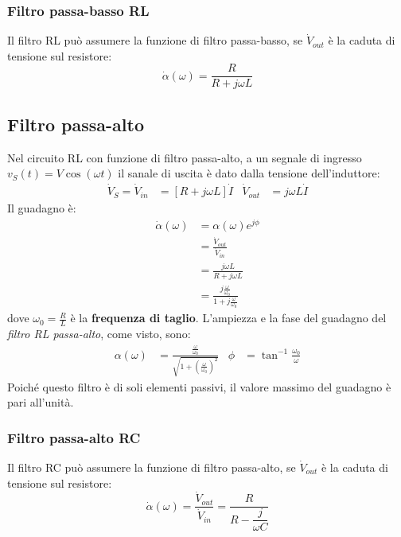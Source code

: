 \documentclass{article}
\begin{document}
\subsubsection{Filtro passa-basso RL}
Il filtro RL può assumere la funzione di filtro
passa-basso, se $\dot V_{out}$ è la caduta di tensione sul resistore:
\[\dot \alpha(\omega)=\frac{R}{R+j \omega L}\]



\subsection{Filtro passa-alto}
Nel circuito RL con funzione di filtro passa-alto, a un segnale di ingresso $v_S(t)=V \cos(\omega t)$ il sanale di uscita è dato dalla tensione dell'induttore:
\begin{align*}
    \dot V_S = \dot V_{in} &= \left[R + j \omega L\right]\dot I & \dot V_{out} &= j \omega L \dot I
\end{align*}
Il guadagno è:
\begin{align*}
    \dot \alpha(\omega) &= \alpha(\omega) e^{j \phi}
    \\
    &=\frac{\dot V_{out}}{\dot V_{in}}
    \\
    &= \frac{j \omega L}{R+j \omega L}
    \\
    &= \frac{j \frac{\omega}{\omega_0}}{1+j \frac{\omega}{\omega_0}}
\end{align*}
dove $\omega_0 = \frac{R}{L}$ è la \textbf{frequenza di taglio}. L'ampiezza e la fase del guadagno del \textit{filtro RL passa-alto}, come visto, sono:
\begin{align*}
    \alpha(\omega) &= \frac{\frac{\omega}{\omega_0}}{\sqrt{1+\left(\frac{\omega}{\omega_0}\right)^2}} & \phi &= \tan^{-1} \frac{\omega_0}{\omega}
\end{align*}
Poiché questo filtro è di soli elementi passivi, il
valore massimo del guadagno è pari all'unità.


\subsubsection{Filtro passa-alto RC}
Il filtro RC può assumere la funzione di filtro
passa-alto, se $\dot V_{out}$ è la caduta di tensione sul resistore:
\[\dot \alpha(\omega) = \frac{\dot V_{out}}{\dot V_{in}} = \frac{R}{R - \dfrac{j}{\omega C}}\]
\end{document}
